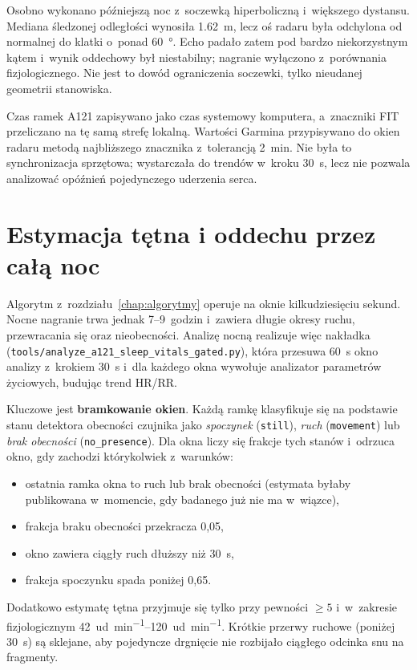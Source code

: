 \documentclass[12pt,a4paper,oneside]{report}
\begin{document}
Osobno wykonano późniejszą noc z~soczewką hiperboliczną i~większego dystansu.
Mediana śledzonej odległości wynosiła \SI{1.62}{m}, lecz oś radaru była
odchylona od normalnej do klatki o~ponad \SI{60}{\degree}. Echo padało zatem
pod bardzo niekorzystnym kątem i~wynik oddechowy był niestabilny; nagranie
wyłączono z~porównania fizjologicznego. Nie jest to dowód ograniczenia
soczewki, tylko nieudanej geometrii stanowiska.

Czas ramek A121 zapisywano jako czas systemowy komputera, a~znaczniki FIT
przeliczano na tę samą strefę lokalną. Wartości Garmina przypisywano do okien
radaru metodą najbliższego znacznika z~tolerancją \SI{2}{min}. Nie była to
synchronizacja sprzętowa; wystarczała do trendów w~kroku \SI{30}{s}, lecz nie
pozwala analizować opóźnień pojedynczego uderzenia serca.

\section{Estymacja tętna i oddechu przez całą noc}
\label{sec:trend-nocny}
Algorytm z~rozdziału~\ref{chap:algorytmy} operuje na oknie kilkudziesięciu
sekund. Nocne nagranie trwa jednak 7--9~godzin i~zawiera długie okresy ruchu,
przewracania się oraz nieobecności. Analizę nocną realizuje więc nakładka
(\texttt{tools/\allowbreak analyze\_a121\_\allowbreak sleep\_vitals\_\allowbreak gated.py}), która przesuwa
\SI{60}{s} okno analizy z~krokiem \SI{30}{s} i~dla każdego okna wywołuje
analizator parametrów życiowych, budując trend HR/RR.

Kluczowe jest \textbf{bramkowanie okien}. Każdą ramkę klasyfikuje się na
podstawie stanu detektora obecności czujnika jako \emph{spoczynek}
(\texttt{still}), \emph{ruch} (\texttt{movement}) lub \emph{brak obecności}
(\texttt{no\_presence}). Dla okna liczy się frakcje tych stanów i~odrzuca
okno, gdy zachodzi którykolwiek z~warunków:
\begin{itemize}
  \item ostatnia ramka okna to ruch lub brak obecności (estymata byłaby
  publikowana w~momencie, gdy badanego już nie ma w~wiązce),
  \item frakcja braku obecności przekracza 0{,}05,
  \item okno zawiera ciągły ruch dłuższy niż \SI{30}{s},
  \item frakcja spoczynku spada poniżej 0{,}65.
\end{itemize}
Dodatkowo estymatę tętna przyjmuje się tylko przy pewności $\geq 5$
i~w~zakresie fizjologicznym \SIrange{42}{120}{ud\per\minute}. Krótkie przerwy
ruchowe (poniżej \SI{30}{s}) są sklejane, aby pojedyncze drgnięcie nie
rozbijało ciągłego odcinka snu na fragmenty.
\end{document}
